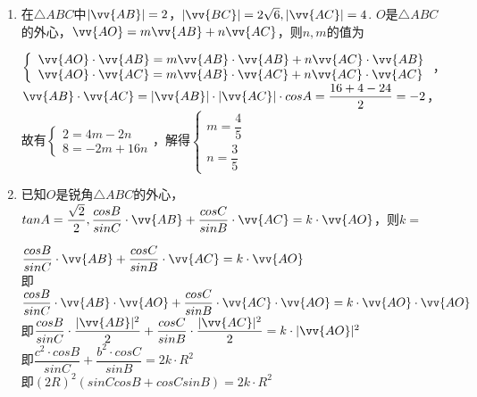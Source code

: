\begin{enumerate}
    \begin{enumerate}
        \item 在$\triangle ABC$中$|\vv{AB}| = 2$，$|\vv{BC}| = 2\sqrt{6}, |\vv{AC}| = 4$. $O$是$\triangle ABC$的外心，$\vv{AO} = m \vv{AB} + n \vv{AC}$，则$n,m$的值为
        \begin{jieda}
            $\left \{ \begin{array}{l}
                 \vv{AO} \cdot \vv{AB} = m\vv{AB} \cdot \vv{AB} + n \vv{AC} \cdot \vv{AB} \\
                 \vv{AO} \cdot \vv{AC} = m\vv{AB} \cdot \vv{AC} + n \vv{AC} \cdot \vv{AC}
            \end{array} \right.$，$\vv{AB}\cdot \vv{AC} = |\vv{AB}| \cdot |\vv{AC}| \cdot cosA = \dfrac{16+4-24}{2} = -2$，故有$\left \{ \begin{array}{l}
                2 = 4m - 2n \\
                8 = -2m + 16n
            \end{array} \right.$，解得$\left \{ \begin{array}{l}
                m = \dfrac{4}{5} \\
                n = \dfrac{3}{5}
            \end{array} \right.$
        \end{jieda}
        \item 已知$O$是锐角$\triangle ABC$的外心，$tanA = \dfrac{\sqrt{2}}{2}, \dfrac{cosB}{sinC} \cdot \vv{AB} + \dfrac{cosC}{sinB} \cdot \vv{AC} = k \cdot \vv{AO}$，则$k = $
        \begin{jieda}
            $\dfrac{cosB}{sinC} \cdot \vv{AB} + \dfrac{cosC}{sinB} \cdot \vv{AC} = k \cdot \vv{AO}$\\
            即$\dfrac{cosB}{sinC} \cdot \vv{AB} \cdot \vv{AO} + \dfrac{cosC}{sinB} \cdot \vv{AC} \cdot \vv{AO} = k \cdot \vv{AO} \cdot \vv{AO}$\\
            即$\dfrac{cosB}{sinC} \cdot \dfrac{|\vv{AB}|^2}{2} + \dfrac{cosC}{sinB} \cdot \dfrac{|\vv{AC}|^2}{2} = k \cdot |\vv{AO}|^2$\\
            即$\dfrac{c^2 \cdot cosB}{sinC}+ \dfrac{b^2 \cdot cosC}{sinB} = 2k \cdot R^2$ \\
            即$(2R)^2(sinCcosB+cosCsinB) = 2k\cdot R^2$\\

\end{jieda}
\end{enumerate}
\end{enumerate}
